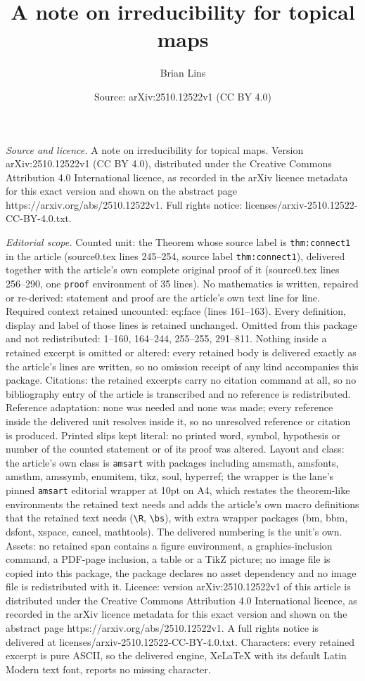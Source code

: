 \documentclass[10pt,a4paper]{amsart}
\title[A note on irreducibility for topical maps]{A note on irreducibility for topical maps}
\author{Brian Lins}
\date{Source: arXiv:2510.12522v1 (CC BY 4.0)}
\begin{document}
\maketitle

\noindent\emph{Source and licence.} A note on irreducibility for topical maps. Version arXiv:2510.12522v1 (CC BY 4.0), distributed under the Creative Commons Attribution 4.0 International licence, as recorded in the arXiv licence metadata for this exact version and shown on the abstract page https://arxiv.org/abs/2510.12522v1. Full rights notice: licenses/arxiv-2510.12522-CC-BY-4.0.txt.\par\smallskip

\noindent\textit{Editorial scope.} Counted unit: the Theorem whose source label is \texttt{thm:connect1} in the article (source0.tex lines 245--254, source label \texttt{thm:connect1}), delivered together with the article's own complete original proof of it (source0.tex lines 256--290, one \texttt{proof} environment of 35 lines). No mathematics is written, repaired or re-derived: statement and proof are the article's own text line for line. Required context retained uncounted: eq:face (lines 161--163). Every definition, display and label of those lines is retained unchanged. Omitted from this package and not redistributed: 1--160, 164--244, 255--255, 291--811. Nothing inside a retained excerpt is omitted or altered: every retained body is delivered exactly as the article's lines are written, so no omission receipt of any kind accompanies this package. Citations: the retained excerpts carry no citation command at all, so no bibliography entry of the article is transcribed and no reference is redistributed. Reference adaptation: none was needed and none was made; every reference inside the delivered unit resolves inside it, so no unresolved reference or citation is produced. Printed slips kept literal: no printed word, symbol, hypothesis or number of the counted statement or of its proof was altered. Layout and class: the article's own class is \texttt{amsart} with packages including amsmath, amsfonts, amsthm, amssymb, enumitem, tikz, soul, hyperref; the wrapper is the lane's pinned \texttt{amsart} editorial wrapper at 10pt on A4, which restates the theorem-like environments the retained text needs and adds the article's own macro definitions that the retained text needs (\texttt{\textbackslash R}, \texttt{\textbackslash bs}), with extra wrapper packages (bm, bbm, dsfont, xspace, cancel, mathtools). The delivered numbering is the unit's own. Assets: no retained span contains a figure environment, a graphics-inclusion command, a PDF-page inclusion, a table or a TikZ picture; no image file is copied into this package, the package declares no asset dependency and no image file is redistributed with it. Licence: version arXiv:2510.12522v1 of this article is distributed under the Creative Commons Attribution 4.0 International licence, as recorded in the arXiv licence metadata for this exact version and shown on the abstract page https://arxiv.org/abs/2510.12522v1. A full rights notice is delivered at licenses/arxiv-2510.12522-CC-BY-4.0.txt. Characters: every retained excerpt is pure ASCII, so the delivered engine, XeLaTeX with its default Latin Modern text font, reports no missing character.
\end{document}
